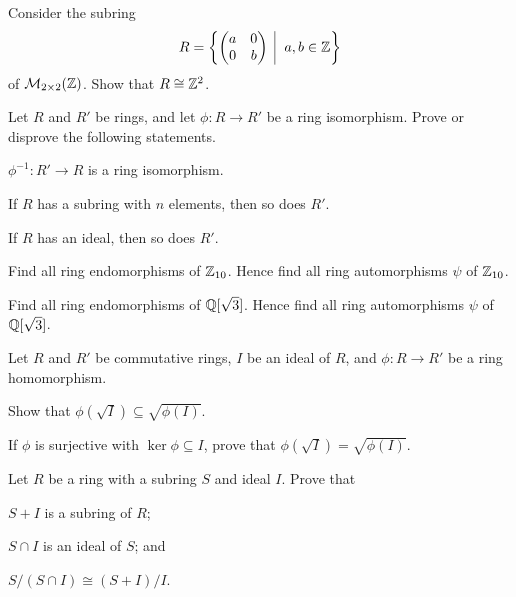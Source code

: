 \begin{problem}
    Consider the subring
    \[
        R = \left\{\begin{pmatrix}a&0\\0&b\end{pmatrix}\vert a,b \in \Z\right\}
    \]
    of $\mathcal{M}_{2\times2}(\mathbb{Z})$. Show that $R \cong \mathbb{Z}^2$.
\end{problem}

\begin{problem}\label{problem-properties-of-ring-isomorphism}
    Let $R$ and $R'$ be rings, and let $\phi: R \to R'$ be a ring isomorphism. Prove or disprove the following statements.
    \begin{partquestions}{\alph*}
        \item $\phi^{-1}: R' \to R$ is a ring isomorphism.
        \item If $R$ has a subring with $n$ elements, then so does $R'$.
        \item If $R$ has an ideal, then so does $R'$.
    \end{partquestions}
\end{problem}

\begin{problem}
    Find all ring endomorphisms of $\mathbb{Z}_{10}$. Hence find all ring automorphisms $\psi$ of $\mathbb{Z}_{10}$.
\end{problem}

\begin{problem}
    Find all ring endomorphisms of $\mathbb{Q}[\sqrt3]$. Hence find all ring automorphisms $\psi$ of $\mathbb{Q}[\sqrt3]$.
\end{problem}

\begin{problem}
    Let $R$ and $R'$ be commutative rings, $I$ be an ideal of $R$, and $\phi: R\to R'$ be a ring homomorphism.
    \begin{partquestions}{\roman*}
        \item Show that $\phi(\sqrt I) \subseteq \sqrt{\phi(I)}$.
        \item If $\phi$ is surjective with $\ker\phi \subseteq I$, prove that $\phi(\sqrt I) = \sqrt{\phi(I)}$.
    \end{partquestions}
\end{problem}

\begin{problem}\label{problem-ring-isomorphism-2}
    Let $R$ be a ring with a subring $S$ and ideal $I$. Prove that
    \begin{partquestions}{\roman*}
        \item $S+I$ is a subring of $R$;
        \item $S \cap I$ is an ideal of $S$; and
        \item $S/(S\cap I)\cong (S+I)/I$.
    \end{partquestions}
\end{problem}



